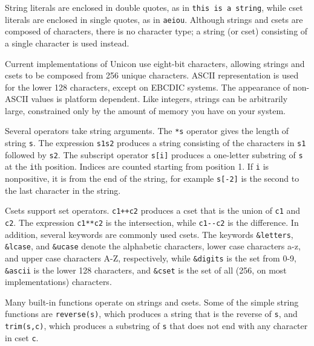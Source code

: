 String literals are enclosed in double quotes, as
in \texttt{{\textquotedbl}this is a string{\textquotedbl}}, while
cset literals are enclosed in single quotes, as in
\texttt{{\textquotesingle}aeiou{\textquotesingle}}. Although strings
and csets are composed of characters, there is no
character type; a string (or cset) consisting of a
single character is used instead.

Current implementations of Unicon use eight-bit characters, allowing
strings and csets to be composed from 256 unique characters.
ASCII representation is used for the lower 128 characters,
except on EBCDIC systems. The appearance of non-ASCII
values is platform dependent. Like integers, strings can be arbitrarily
large, constrained only by the amount of memory you have on your
system.

Several operators take string arguments. The \texttt{*s} operator gives the length
of string \texttt{s}. The expression \texttt{s1{\textbar}{\textbar}s2} produces a
string consisting of the characters in \texttt{s1} followed by
\texttt{s2}. The subscript operator
\texttt{s[i]} produces a one-letter
substring of \texttt{s} at the \texttt{i}th position.
Indices are counted starting from
position 1. If \texttt{i} is nonpositive, it is from the end of the
string, for example \texttt{s[-2]} is the second to the last character
in the string.

Csets support set operators. \texttt{c1++c2}
produces a cset that is the union of \texttt{c1} and \texttt{c2}.
The expression \texttt{c1**c2} is the
intersection, while \texttt{c1-{}-c2} is
the difference. In addition, several keywords are commonly used
csets. The keywords \texttt{\&letters},
\texttt{\&lcase}, and \texttt{\&ucase} denote the alphabetic
characters, lower case characters a-z, and
upper case characters A-Z, respectively, while
\texttt{\&digits} is the set from 0-9,
\texttt{\&ascii} is the lower 128 characters, and
\texttt{\&cset} is the set of all (256,
on most implementations) characters.

Many built-in functions operate on strings and csets. Some of the simple
string functions are \texttt{reverse(s)}, which
produces a string that is the reverse of \texttt{s}, and
\texttt{trim(s,c)}, which produces a substring of
\texttt{s} that does not end with any character in cset \texttt{c}.

